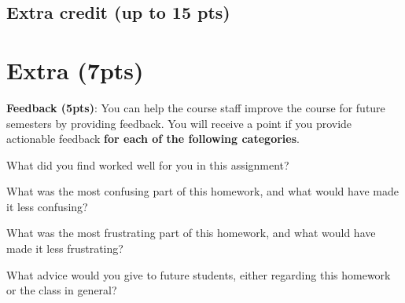 \documentclass[12pt]{article}
\begin{document}


\subsection*{Extra credit (up to 15 pts)}
\begin{solution}[height=20cm]
\end{solution}

\clearpage
\section*{Extra (7pts)}

\textbf{Feedback (5pts)}: You can help the course staff improve the course for future semesters by providing feedback. You will receive a point if you provide actionable feedback \textbf{for each of the following categories}.

What did you find worked well for you in this assignment?
\begin{solution}[height=4cm]
\end{solution}


What was the most confusing part of this homework, and what would have made it less confusing?
\begin{solution}[height=4cm]
\end{solution}

What was the most frustrating part of this homework, and what would have made it less frustrating?
\begin{solution}[height=4cm]
\end{solution}

\newpage

What advice would you give to future students, either regarding this homework or the class in general?
\begin{solution}[height=4cm]
\end{solution}
\end{document}
